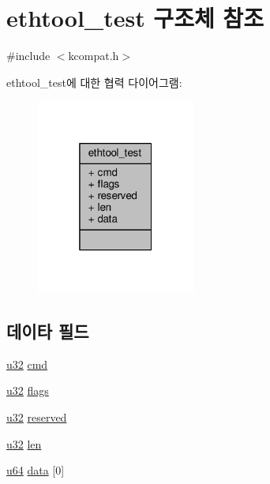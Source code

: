 \hypertarget{structethtool__test}{}\section{ethtool\+\_\+test 구조체 참조}
\label{structethtool__test}


{\ttfamily \#include $<$kcompat.\+h$>$}



ethtool\+\_\+test에 대한 협력 다이어그램\+:
\nopagebreak
\begin{figure}[H]
\begin{center}
\leavevmode
\includegraphics[width=148pt]{structethtool__test__coll__graph}
\end{center}
\end{figure}
\subsection*{데이타 필드}
\begin{DoxyCompactItemize}
\item 
\hyperlink{lib_2igb_2e1000__osdep_8h_a64e91c10a0d8fb627e92932050284264}{u32} \hyperlink{structethtool__test_a62fe2a1dbf17d5a8561a5a7f5a97a9ba}{cmd}
\item 
\hyperlink{lib_2igb_2e1000__osdep_8h_a64e91c10a0d8fb627e92932050284264}{u32} \hyperlink{structethtool__test_a9fb2abd9f2594cefc48d6856e01f2879}{flags}
\item 
\hyperlink{lib_2igb_2e1000__osdep_8h_a64e91c10a0d8fb627e92932050284264}{u32} \hyperlink{structethtool__test_ac429abb4d17158f1d4b8390ae6a1ee8f}{reserved}
\item 
\hyperlink{lib_2igb_2e1000__osdep_8h_a64e91c10a0d8fb627e92932050284264}{u32} \hyperlink{structethtool__test_a4105737bcbe35c1fd69996a085d8231a}{len}
\item 
\hyperlink{lib_2igb_2e1000__osdep_8h_a1d8f78f95a414480659f3182e6067b80}{u64} \hyperlink{structethtool__test_ae94c28f3505a41fa45aad7ce037322f5}{data} \mbox{[}0\mbox{]}
\end{DoxyCompactItemize}


